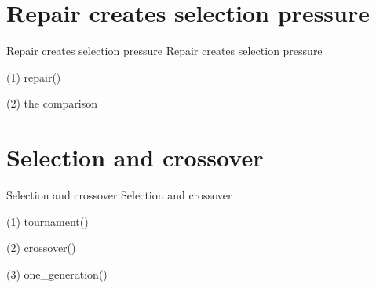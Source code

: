 \section{Repair creates selection pressure}

\begin{frame}{Repair creates selection pressure}
Repair creates selection pressure
\end{frame}

\begin{frame}[fragile]{(1) repair()}

\end{frame}

\begin{frame}[fragile]{(2) the comparison}

\end{frame}


\section{Selection and crossover}

\begin{frame}{Selection and crossover}
Selection and crossover
\end{frame}

\begin{frame}[fragile]{(1) tournament()}

\end{frame}

\begin{frame}[fragile]{(2) crossover()}

\end{frame}

\begin{frame}[fragile]{(3) one\_generation()}

\end{frame}

